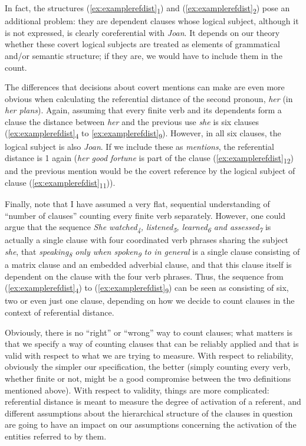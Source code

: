 In fact, the structures (\ref{ex:examplerefdist}\textsubscript{1}) and (\ref{ex:examplerefdist}\textsubscript{2}) pose an additional problem: they are dependent clauses whose logical subject, although it is not expressed, is clearly coreferential with \textit{Joan}. It depends on our theory whether these covert logical subjects are treated as elements of grammatical and\slash or semantic  structure; if they are, we would have to include them in the count.

The differences that decisions about covert mentions can make are even more obvious when calculating the referential distance  of the second pronoun,  \textit{her} (in \textit{her plans}). Again, assuming that every finite verb  and its dependents form a clause the distance between \textit{her} and the previous use \textit{she} is six clauses (\ref{ex:examplerefdist}\textsubscript{4} to \ref{ex:examplerefdist}\textsubscript{9}). However, in all six clauses, the logical subject is also \textit{Joan}. If we include these as \textit{mentions}, the referential distance  is 1 again (\textit{her good fortune} is part of the clause (\ref{ex:examplerefdist}\textsubscript{12}) and the previous mention would be the covert reference by the logical subject of clause (\ref{ex:examplerefdist}\textsubscript{11})).\largerpage

Finally, note that I have assumed a very flat, sequential understanding of ``number of clauses'' counting every finite verb  separately. However, one could argue that the sequence \textit{She watched\textsubscript{4}, listened\textsubscript{5}, learned\textsubscript{6} and assessed\textsubscript{7}} is actually a single clause with four coordinated  verb phrases sharing the subject \textit{she}, that \textit{speaking\textsubscript{8} only when spoken\textsubscript{9} to in general} is a single clause consisting of a matrix clause and an embedded adverbial  clause, and that this clause itself is dependent on the clause with the four verb  phrases. Thus, the sequence from (\ref{ex:examplerefdist}\textsubscript{4}) to (\ref{ex:examplerefdist}\textsubscript{9}) can be seen as consisting of six, two or even just one clause, depending on how we decide to count clauses in the context of referential  distance.

Obviously, there is no ``right'' or ``wrong'' way to count clauses; what matters is that we specify a way of counting clauses that can be reliably  applied and that is valid  with respect to what we are trying to measure.  With respect to reliability, obviously the simpler our specification, the better (simply counting every verb,  whether finite or not, might be a good compromise between the two definitions mentioned above). With respect to validity, things are more complicated: referential distance  is meant to measure  the degree of activation of a referent, and different assumptions about the hierarchical structure of the clauses in question are going to have an impact on our assumptions concerning the activation of the entities referred to by them.\largerpage

